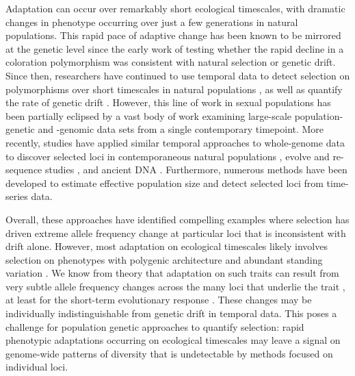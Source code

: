 \documentclass[11pt]{article}
\begin{document}
Adaptation can occur over remarkably short ecological timescales, with
dramatic changes in phenotype occurring over just a few generations in natural
populations. This rapid pace of adaptive change has been known to be mirrored
at the genetic level since the early work of \textcite{Fisher1947-tf}  testing
whether the rapid decline in a coloration polymorphism was consistent with
natural selection or genetic drift. Since then, researchers have continued to
use temporal data to detect selection on polymorphisms over short timescales in
natural populations
\parencite{Kettlewell1958-or,Kettlewell1961-ok,Fisher1947-tf,Dobzhansky1943-lh,Dobzhansky1971-vf,Mueller1985-eo},
as well as quantify the rate of genetic drift
\parencite{Nei1981-oy,Pollak1983-xh,Mueller1985-eg,Waples1989-sj,Wang2003-ev,Prout1954-yy,Wallace1956-jb}.
However, this line of work in sexual populations has been partially eclipsed by
a vast body of work examining large-scale population-genetic and -genomic data
sets from a single contemporary timepoint. More recently, studies have applied
similar temporal approaches to whole-genome data to discover selected loci in
contemporaneous natural populations
\parencite{Bergland2014-ij,Rajpurohit2018-od}, evolve and re-sequence studies
\parencite{Burke2010-tz,Johansson2010-ya,Teotonio2009-sa,Turner2011-sx,Turner2012-bm,Franssen2017-lx,Orozco-terWengel2012-fu,Barghi2019-qy},
and ancient DNA \parencite{Mathieson2015-uw,Fu2016-ek}. Furthermore,
  numerous methods have been developed to estimate effective population size
\parencite{Pollak1983-xh,Waples1989-sj,Nei1981-oy} and detect selected loci
\parencite{Feder2014-lc,Mathieson2013-we,Terhorst2015-rg,Malaspinas2012-aw}
from time-series data.

Overall, these approaches have identified compelling examples where selection has driven
extreme allele frequency change at particular loci that is inconsistent with
drift alone.  However, most adaptation on ecological timescales likely involves
selection on phenotypes with polygenic architecture and abundant standing
variation \parencite{Endler1986-wd,Hendry1999-zu,Kinnison2001-vb,Kopp2009-pj}.
We know from theory that adaptation on such traits can result from very subtle
allele frequency changes across the many loci that underlie the trait
\parencite{Bulmer1980-zo}, at least for the short-term evolutionary response
\parencite{Jain2017-mw,Jain2015-xy,Thornton2018-eo,Chevin2008-lt,Hermisson2005-hs,Hollinger2019-mn}.
These changes may be individually indistinguishable from genetic drift in
temporal data. This poses a challenge for population genetic approaches to
quantify selection: rapid phenotypic adaptations occurring on ecological
timescales may leave a signal on genome-wide patterns of diversity that is
undetectable by methods focused on individual loci.
\end{document}
